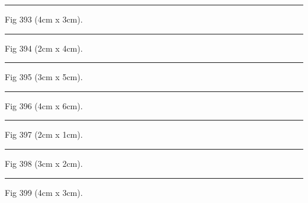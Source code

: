 \documentclass[a4paper,11pt]{article}
\begin{document}
\begin{swarmwrap}%
  \begin{minipage}[t]{4cm}
    \centering
    \rule{\linewidth}{3cm}
    {\footnotesize Fig 393 (4cm x 3cm).}
  \end{minipage}%
\end{swarmwrap}%
\swarmwrapnext
\lipsum[93]%

\begin{swarmwrap}%
  \begin{minipage}[t]{2cm}
    \centering
    \rule{\linewidth}{4cm}
    {\footnotesize Fig 394 (2cm x 4cm).}
  \end{minipage}%
\end{swarmwrap}%
\swarmwrapnext
\lipsum[94]%

\begin{swarmwrap}%
  \begin{minipage}[t]{3cm}
    \centering
    \rule{\linewidth}{5cm}
    {\footnotesize Fig 395 (3cm x 5cm).}
  \end{minipage}%
\end{swarmwrap}%
\swarmwrapnext
\lipsum[95]%

\begin{swarmwrap}%
  \begin{minipage}[t]{4cm}
    \centering
    \rule{\linewidth}{6cm}
    {\footnotesize Fig 396 (4cm x 6cm).}
  \end{minipage}%
\end{swarmwrap}%
\swarmwrapnext
\lipsum[96]%

\begin{swarmwrap}%
  \begin{minipage}[t]{2cm}
    \centering
    \rule{\linewidth}{1cm}
    {\footnotesize Fig 397 (2cm x 1cm).}
  \end{minipage}%
\end{swarmwrap}%
\swarmwrapnext
\lipsum[97]%

\begin{swarmwrap}%
  \begin{minipage}[t]{3cm}
    \centering
    \rule{\linewidth}{2cm}
    {\footnotesize Fig 398 (3cm x 2cm).}
  \end{minipage}%
\end{swarmwrap}%
\swarmwrapnext
\lipsum[98]%

\begin{swarmwrap}%
  \begin{minipage}[t]{4cm}
    \centering
    \rule{\linewidth}{3cm}
    {\footnotesize Fig 399 (4cm x 3cm).}
  \end{minipage}%
\end{swarmwrap}%
\swarmwrapnext
\lipsum[99]%
\end{document}
